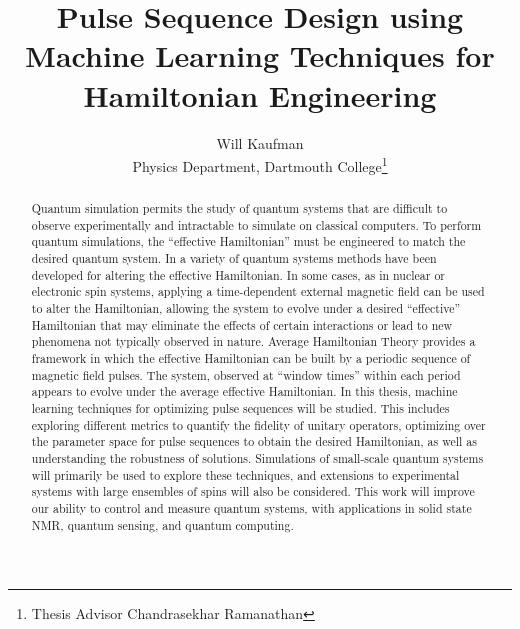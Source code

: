 \documentclass{report}
\title{Pulse Sequence Design using Machine Learning Techniques for Hamiltonian Engineering}
\author{Will Kaufman \\ Physics Department, Dartmouth College\thanks{Thesis Advisor Chandrasekhar Ramanathan}}
\begin{document}
\maketitle

\begin{abstract}


%
%
%
Quantum simulation permits the study of quantum systems that are difficult to observe experimentally and intractable to simulate on classical computers. To perform quantum simulations, the ``effective Hamiltonian'' must be engineered to match the desired quantum system.
In a variety of quantum systems methods have been developed for altering the effective Hamiltonian.
In some cases, as in nuclear or electronic spin systems, applying a time-dependent external magnetic field can be used to alter the Hamiltonian, allowing the system to evolve under a desired ``effective'' Hamiltonian that may eliminate the effects of certain interactions or lead to new phenomena not typically observed in nature. Average Hamiltonian Theory provides a framework in which the effective Hamiltonian can be built by a periodic sequence of magnetic field pulses. The system, observed at ``window times'' within each period appears to evolve under the average effective Hamiltonian.
In this thesis, machine learning techniques for optimizing pulse sequences will be studied. This includes exploring different metrics to quantify the fidelity of unitary operators, optimizing over the parameter space for pulse sequences to obtain the desired Hamiltonian, as well as understanding the robustness of solutions. Simulations of small-scale quantum systems will primarily be used to explore these techniques, and extensions to experimental systems with large ensembles of spins will also be considered.
This work will improve our ability to control and measure quantum systems, with applications in solid state NMR, quantum sensing, and quantum computing.

\end{abstract}

\tableofcontents










\end{document}
